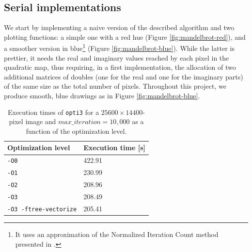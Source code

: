 \documentclass[11pt,a4paper]{article}
\begin{document}
\vspace{-0.3cm}
\subsection{Serial implementations}

We start by implementing a naive version of the described algorithm and two plotting functions: a simple one with a red hue (Figure \ref{fig:mandelbrot-red}), and a smoother version in blue\footnote{It uses an approximation of the Normalized Iteration Count method presented in \cite{smooth}.} (Figure \ref{fig:mandelbrot-blue}).
While the latter is prettier, it needs the real and imaginary values reached by each pixel in the quadratic map, thus requiring, in a first implementation, the allocation of two additional matrices of doubles (one for the real and one for the imaginary parts) of the same size as the total number of pixels.
Throughout this project, we produce smooth, blue drawings as in Figure \ref{fig:mandelbrot-blue}.\\[-7pt]
\begin{table}[t]
	\vspace{-0.5cm}
	\begin{minipage}[b]{0.4\linewidth}
		\centering
		\vspace{0.2cm}
		 \label{fig:bulbs}
	\end{minipage}\hfill
	\begin{minipage}[b]{0.56\linewidth}
		\centering
		\begin{tabular}{|l|l|} 
			\hline
			\textbf{Optimization level} & \textbf{Execution time [s]} \\ [0.2ex] 
			\hline\hline
			\texttt{-O0} & 422.91 \\ 
			\texttt{-O1} & 230.99 \\
			\texttt{-O2} & 208.96 \\
			\texttt{-O3} & 208.49 \\
			\texttt{-O3 -ftree-vectorize} & 205.41 \\ [0.2ex] 
			\hline
		\end{tabular}
		\vspace{0.2cm}
		\caption{Execution times of \texttt{opti3} for a $25600\times14400$-pixel image and $max\_iteration=10,000$ as a function of the optimization level.}
		\label{tab:opti-levels}
		\vspace{-0.2cm}
	\end{minipage}
\end{table}
\end{document}
